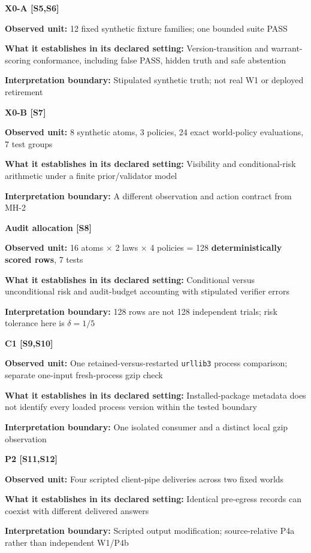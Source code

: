 \documentclass[
  10pt,
  american,
  a4paper,
]{article}
\begin{document}
\textbf{X0-A {[}S5,S6{]}}

\textbf{Observed unit:} 12 fixed synthetic fixture families; one bounded
suite PASS

\textbf{What it establishes in its declared setting:} Version-transition
and warrant-scoring conformance, including false PASS, hidden truth and
safe abstention

\textbf{Interpretation boundary:} Stipulated synthetic truth; not real
W1 or deployed retirement

\textbf{X0-B {[}S7{]}}

\textbf{Observed unit:} 8 synthetic atoms, 3 policies, 24 exact
world-policy evaluations, 7 test groups

\textbf{What it establishes in its declared setting:} Visibility and
conditional-risk arithmetic under a finite prior/validator model

\textbf{Interpretation boundary:} A different observation and action
contract from MH-2

\textbf{Audit allocation {[}S8{]}}

\textbf{Observed unit:} 16 atoms × 2 laws × 4 policies = 128
\textbf{deterministically scored rows}, 7 tests

\textbf{What it establishes in its declared setting:} Conditional versus
unconditional risk and audit-budget accounting with stipulated verifier
errors

\textbf{Interpretation boundary:} 128 rows are not 128 independent
trials; risk tolerance here is \(\delta=1/5\)

\textbf{C1 {[}S9,S10{]}}

\textbf{Observed unit:} One retained-versus-restarted \texttt{urllib3}
process comparison; separate one-input fresh-process gzip check

\textbf{What it establishes in its declared setting:} Installed-package
metadata does not identify every loaded process version within the
tested boundary

\textbf{Interpretation boundary:} One isolated consumer and a distinct
local gzip observation

\textbf{P2 {[}S11,S12{]}}

\textbf{Observed unit:} Four scripted client-pipe deliveries across two
fixed worlds

\textbf{What it establishes in its declared setting:} Identical
pre-egress records can coexist with different delivered answers

\textbf{Interpretation boundary:} Scripted output modification;
source-relative P4a rather than independent W1/P4b
\end{document}
